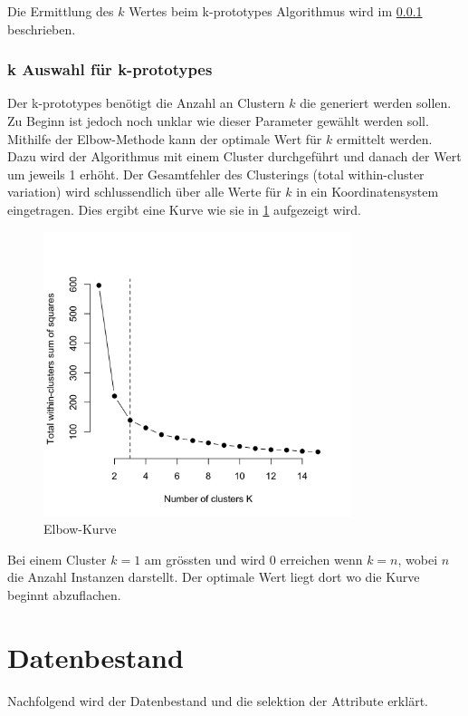 Die Ermittlung des $k$ Wertes beim k-prototypes Algorithmus wird im \cref{sec:konzept:parameterauswahl:kprototypes} beschrieben.

\subsubsection{k Auswahl für k-prototypes}
\label{sec:konzept:parameterauswahl:kprototypes}
Der k-prototypes benötigt die Anzahl an Clustern $k$ die generiert werden sollen. Zu Beginn ist jedoch noch unklar wie dieser Parameter gewählt werden soll. Mithilfe der Elbow-Methode kann der optimale Wert für $k$ ermittelt werden. Dazu wird der Algorithmus mit einem Cluster durchgeführt und danach der Wert um jeweils 1 erhöht. Der Gesamtfehler des Clusterings (total within-cluster variation) wird schlussendlich über alle Werte für $k$ in ein Koordinatensystem eingetragen. Dies ergibt eine Kurve wie sie in \cref{fig:konzept:parameterauswahl:kprototypes} aufgezeigt wird.

\begin{figure}[H]
	\RawFloats
	\centering
	\includegraphics[width=0.8\textwidth]{images/elbow-curve.png}
	\caption{Elbow-Kurve}
	\label{fig:konzept:parameterauswahl:kprototypes}
\end{figure}

Bei einem Cluster $k=1$ am grössten und wird 0 erreichen wenn $k=n$, wobei $n$ die Anzahl Instanzen darstellt. Der optimale Wert liegt dort wo die Kurve beginnt abzuflachen.

\section{Datenbestand}
\label{sec:recherche:datenbestand}
Nachfolgend wird der Datenbestand und die selektion der Attribute erklärt.

